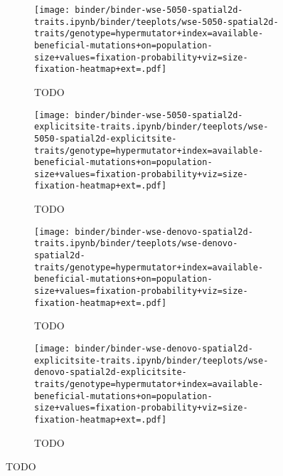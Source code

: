 \begin{figure}[h]
    \begin{subfigure}[b]{0.5\linewidth}
        \begin{minipage}{\linewidth}
          \texttt{[image: binder/binder-wse-5050-spatial2d-traits.ipynb/binder/teeplots/wse-5050-spatial2d-traits/genotype=hypermutator+index=available-beneficial-mutations+on=population-size+values=fixation-probability+viz=size-fixation-heatmap+ext=.pdf]}%
        \end{minipage}
        \begin{minipage}{\linewidth}
        \caption{TODO}
        \label{fig:fixheat-wse-256atile:5050}
        \end{minipage}%
    \end{subfigure}%
    \begin{subfigure}[b]{0.5\linewidth}
        \begin{minipage}{\linewidth}
          \texttt{[image: binder/binder-wse-5050-spatial2d-explicitsite-traits.ipynb/binder/teeplots/wse-5050-spatial2d-explicitsite-traits/genotype=hypermutator+index=available-beneficial-mutations+on=population-size+values=fixation-probability+viz=size-fixation-heatmap+ext=.pdf]}%
        \end{minipage}
        \begin{minipage}{\linewidth}
        \caption{TODO}
        \label{fig:fixheat-wse-256atile:5050-explicitsite}
        \end{minipage}%
    \end{subfigure}

\begin{subfigure}[b]{0.5\linewidth}
    \begin{minipage}{\linewidth}
          \texttt{[image: binder/binder-wse-denovo-spatial2d-traits.ipynb/binder/teeplots/wse-denovo-spatial2d-traits/genotype=hypermutator+index=available-beneficial-mutations+on=population-size+values=fixation-probability+viz=size-fixation-heatmap+ext=.pdf]}%
    \end{minipage}
    \begin{minipage}{\linewidth}
    \caption{TODO}
    \label{fig:fixheat-denovo-cupy:denovo}
    \end{minipage}%
\end{subfigure}%
\begin{subfigure}[b]{0.5\linewidth}
    \begin{minipage}{\linewidth}
          \texttt{[image: binder/binder-wse-denovo-spatial2d-explicitsite-traits.ipynb/binder/teeplots/wse-denovo-spatial2d-explicitsite-traits/genotype=hypermutator+index=available-beneficial-mutations+on=population-size+values=fixation-probability+viz=size-fixation-heatmap+ext=.pdf]}%
    \end{minipage}
    \begin{minipage}{\linewidth}
    \caption{TODO}
    \label{fig:fixheat-wse-256atile:denovo-explicitsite}
    \end{minipage}%
\end{subfigure}


\end{figure}
